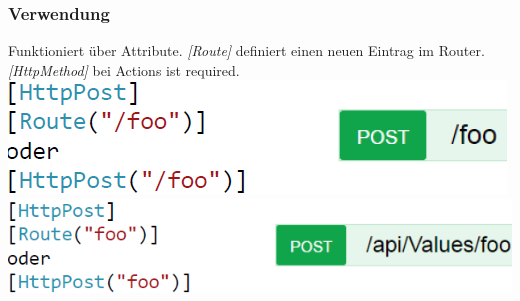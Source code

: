 \subsubsection{Verwendung}
Funktioniert über Attribute. \textit{[Route]} definiert einen neuen Eintrag im Router.
\textit{[HttpMethod]} bei Actions ist required.\\
\includegraphics[width=0.45\linewidth]{img/asp_api_routing.png}
\includegraphics[width=0.55\linewidth]{img/asp_api_routing2.png}
